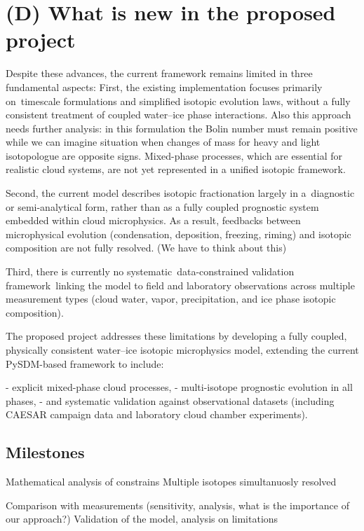 \documentclass[11pt,a4paper]{article}
\begin{document}
\section*{(D) What is new in the proposed project}
Despite these advances, the current framework remains limited in three fundamental aspects:
First, the existing implementation focuses primarily on timescale formulations and simplified isotopic evolution laws,
without a fully consistent treatment of coupled water–ice phase interactions.
Also this approach needs further analysis: in this formulation the Bolin number must remain
positive while we can imagine situation when
changes of mass for heavy and light isotopologue are opposite signs.
Mixed-phase processes, which are essential for realistic cloud systems,
are not yet represented in a unified isotopic framework.

Second, the current model describes isotopic fractionation largely in
a diagnostic or semi-analytical form,
rather than as a fully coupled prognostic system embedded within cloud microphysics.
As a result, feedbacks between microphysical evolution
(condensation, deposition, freezing, riming)
and isotopic composition are not fully resolved.
(We have to think about this)

Third, there is currently no systematic data-constrained validation framework linking
the model to field and laboratory observations across multiple measurement types
(cloud water, vapor, precipitation, and ice phase isotopic composition).

The proposed project addresses these limitations by developing a fully coupled,
physically consistent water–ice isotopic microphysics model, extending the current PySDM-based framework to include:

- explicit mixed-phase cloud processes,
- multi-isotope prognostic evolution in all phases,
- and systematic validation against observational datasets (including CAESAR campaign data and laboratory cloud chamber experiments).





\subsection{Milestones}
Mathematical analysis of constrains
Multiple isotopes simultanuosly resolved

Comparison with measurements (sensitivity, analysis, what is the importance of our approach?)
Validation of the model, analysis on limitations
\end{document}
